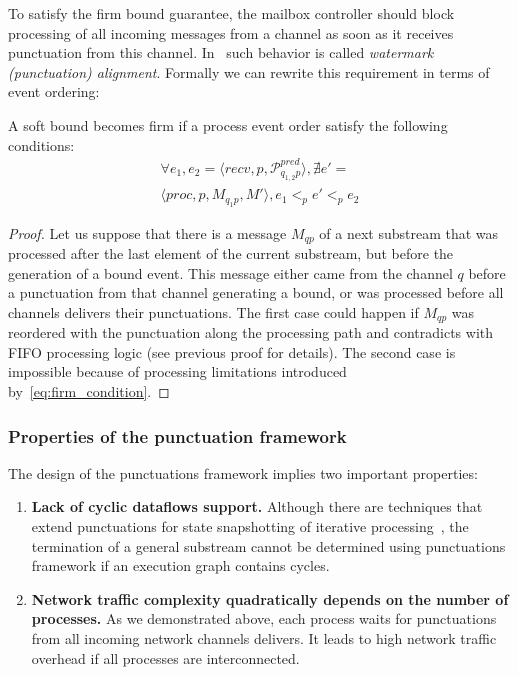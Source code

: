 To satisfy the firm bound guarantee, the mailbox controller should block processing of all incoming messages from a channel as soon as it receives punctuation from this channel. In~\cite{Carbone:2017:SMA:3137765.3137777} such behavior is called {\em watermark (punctuation) alignment}. Formally we can rewrite this requirement in terms of event ordering:

\begin{lemma}
A soft bound becomes firm if a process event order satisfy the following conditions:
\begin{multline}
\label{eq:firm_condition}
\forall e_1, e_2 = \langle recv, p, \mathcal{P}^{pred}_{q_{1,2}p} \rangle, \nexists e' = \\ \langle proc, p, M_{q_1p}, M' \rangle, e_1 <_p e' <_p e_2
\end{multline}
\end{lemma}
\begin{proof}
Let us suppose that there is a message $M_{qp}$ of a next substream that was processed after the last element of the current substream, but before the generation of a bound event. This message either came from the channel $q$ before a punctuation from that channel generating a bound, or was processed before all channels delivers their punctuations. The first case could happen if $M_{qp}$ was reordered with the punctuation along the processing path and contradicts with FIFO processing logic (see previous proof for details). The second case is impossible because of processing limitations introduced by~\ref{eq:firm_condition}.
\end{proof}

\subsubsection{Properties of the punctuation framework}

The design of the punctuations framework implies two important properties:

\begin{enumerate}
    \item {\bf Lack of cyclic dataflows support.} Although there are techniques that extend punctuations for state snapshotting of iterative processing~\cite{Carbone:2017:SMA:3137765.3137777}, the termination of a general substream cannot be determined using punctuations framework if an execution graph contains cycles.
    \item {\bf Network traffic complexity quadratically depends on the number of processes.} As we demonstrated above, each process waits for punctuations from all incoming network channels delivers. It leads to high network traffic overhead if all processes are interconnected.
\end{enumerate}

